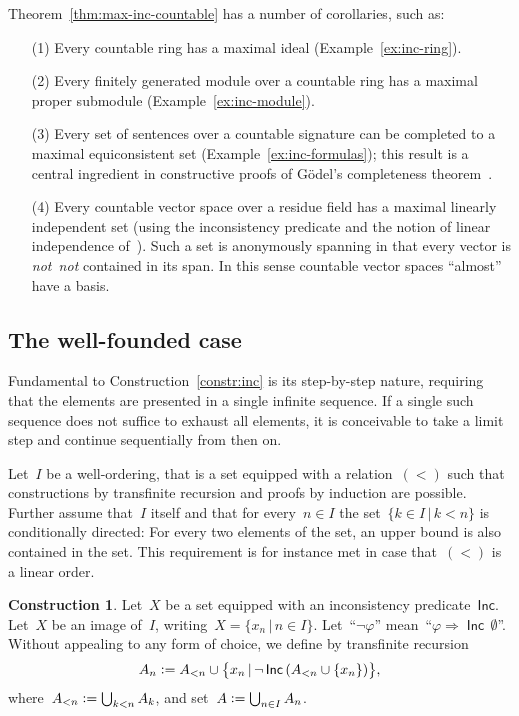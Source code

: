 \documentclass[com,11pt,crcready]{iosart2x}
\theoremstyle{definition}
\newtheorem{construction}[definition]{Construction}
\theoremstyle{plain}
\theoremstyle{remark}
\newcommand{\Incbare}{\mathsf{Inc}}
\newcommand{\Inc}[1]{\operatorname{\Incbare}\,#1}
\newcommand{\?}{\,{:}\,}
\newcommand{\defeq}{\vcentcolon=}
\renewcommand{\_}{\mathpunct{.}\,}
\begin{document}
Theorem~\ref{thm:max-inc-countable} has a number of corollaries, such as:
\begin{enumerate}
\item[(1)] Every countable ring has a maximal ideal (Example~\ref{ex:inc-ring}).
\item[(2)] Every finitely generated module
over a countable ring has a maximal proper submodule
(Example~\ref{ex:inc-module}).
\item[(3)] Every set of sentences over a countable signature can be completed to a
maximal equiconsistent set (Example~\ref{ex:inc-formulas});
this result is a central ingredient in constructive proofs of
Gödel's completeness theorem~\cite{krivine:completeness,herbelin-ilik:henkin,forster-kirst-wehr:completeness}.
\item[(4)] Every countable vector space over a residue field has a maximal linearly
independent set (using the inconsistency predicate and the notion of linear
independence of~\cite[Section~6]{wessel-schuster:radical}). Such a set is
anonymously spanning in that every vector is \emph{not~not} contained in its
span. In this sense countable vector spaces ``almost'' have a basis.
\end{enumerate}


\subsection{The well-founded case}

Fundamental to Construction~\ref{constr:inc} is its step-by-step nature,
requiring that the elements are presented in a single infinite sequence.
If a single such sequence does not
suffice to exhaust all elements, it is conceivable to take a limit step and continue
sequentially from then on.

Let~$I$ be a well-ordering, that is a set equipped with a relation~$({<})$ such
that constructions by transfinite recursion and proofs by induction are
possible. Further assume that~$I$ itself and that for every~$n \in
I$ the set~$\{ k \in I \,|\, k < n \}$ is conditionally directed: For every two
elements of the set, an upper bound is also contained in the set. This
requirement is for instance met in case that~$({<})$ is a linear order.

\begin{construction}\label{constr:inc-wf}Let~$X$ be a set equipped with
an inconsistency predicate~$\Incbare$. Let~$X$ be an image of~$I$, writing~$X = \{ x_n
\,|\, n \in I \}$. Let~``$\neg\varphi$'' mean~``$\varphi \Rightarrow
\Inc{\emptyset}$''. Without appealing to any form of choice, we define by
transfinite recursion
\[ A_n \defeq A_{<n} \cup \bigl\{ x_n \,|\, \neg \Inc{(A_{<n}\cup\{x_n\})} \bigr\}, \]
where~$A_{<n} \defeq \bigcup_{k < n} A_k$, and set~$A \defeq \bigcup_{n \in I} A_n$.
\end{construction}
\end{document}
